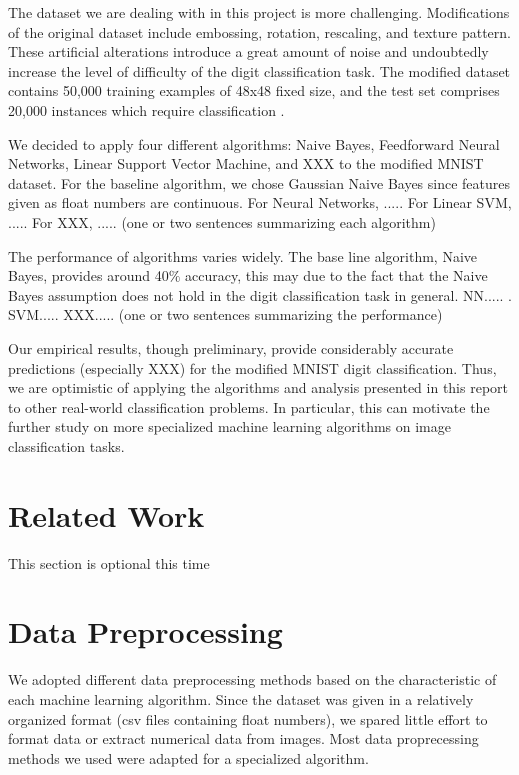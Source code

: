 \documentclass{acm_proc_article-sp}
\begin{document}
The dataset we are dealing with in this project is more challenging. Modifications of the original dataset include embossing, rotation, rescaling, and texture pattern. These artificial alterations introduce a great amount of noise and undoubtedly increase the  level of difficulty of the digit classification task. The modified dataset contains 50,000 training examples of 48x48 fixed size, and the test set comprises 20,000 instances which require classification \cite{comp598p3}.

We decided to apply four different algorithms: Naive Bayes, Feedforward Neural Networks, Linear Support Vector Machine, and XXX to the modified MNIST dataset. For the baseline algorithm, we chose Gaussian Naive Bayes since features given as float numbers are continuous.  For Neural Networks, ..... For Linear SVM, ..... For XXX, ..... (one or two sentences summarizing each algorithm)

The performance of algorithms varies widely. The base line algorithm, Naive Bayes, provides around 40$\%$ accuracy, this may due to the fact that the Naive Bayes assumption does not hold in the digit classification task in general. NN..... . SVM..... XXX..... (one or two sentences summarizing the performance)

Our empirical results, though preliminary, provide considerably accurate predictions (especially XXX) for the modified MNIST digit classification. Thus, we are optimistic of applying the algorithms and analysis presented in this report to other real-world  classification problems. In particular, this can motivate the further study on more specialized machine learning algorithms on image classification tasks.

\section{Related Work}
This section is optional this time








\section{Data Preprocessing}
We adopted different data preprocessing methods based on the characteristic of each machine learning algorithm. Since the dataset was given in a relatively organized format (csv files containing float numbers), we spared little effort to format data or extract numerical data from images. Most data proprecessing methods we used were adapted for a specialized algorithm.
\end{document}
